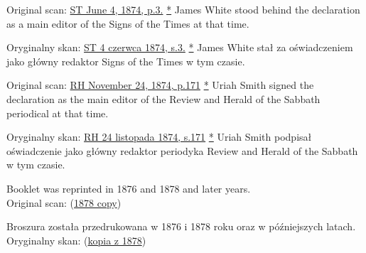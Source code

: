 



Original scan: \href{https://adventistdigitallibrary.org/adl-364148/signs-times-june-4-1874}{ST June 4, 1874, p.3.} \href{https://forgotten-pillar.s3.us-east-2.amazonaws.com/Signs+of+the+Times+_+June+4%2C+1874++.pdf}{*} James White stood behind the declaration as a main editor of the Signs of the Times at that time.


Oryginalny skan: \href{https://adventistdigitallibrary.org/adl-364148/signs-times-june-4-1874}{ST 4 czerwca 1874, s.3.} \href{https://forgotten-pillar.s3.us-east-2.amazonaws.com/Signs+of+the+Times+_+June+4%2C+1874++.pdf}{*} James White stał za oświadczeniem jako główny redaktor Signs of the Times w tym czasie.






Original scan: \href{https://documents.adventistarchives.org/Periodicals/RH/RH18741124-V44-22.pdf}{RH November 24, 1874, p.171} \href{https://forgotten-pillar.s3.us-east-2.amazonaws.com/RH18741124-V44-22.pdf}{*} Uriah Smith signed the declaration as the main editor of the Review and Herald of the Sabbath periodical at that time.


Oryginalny skan: \href{https://documents.adventistarchives.org/Periodicals/RH/RH18741124-V44-22.pdf}{RH 24 listopada 1874, s.171} \href{https://forgotten-pillar.s3.us-east-2.amazonaws.com/RH18741124-V44-22.pdf}{*} Uriah Smith podpisał oświadczenie jako główny redaktor periodyka Review and Herald of the Sabbath w tym czasie.






Booklet was reprinted in 1876 and 1878 and later years. \\
Original scan: (\href{https://adventistdigitallibrary.org/islandora/object/adl%3A22250872?solr_nav%5Bid%5D=a09d3902c2540c98eb7f&solr_nav%5Bpage%5D=56&solr_nav%5Boffset%5D=3}{1878 copy})


Broszura została przedrukowana w 1876 i 1878 roku oraz w późniejszych latach. \\
Oryginalny skan: (\href{https://adventistdigitallibrary.org/islandora/object/adl%3A22250872?solr_nav%5Bid%5D=a09d3902c2540c98eb7f&solr_nav%5Bpage%5D=56&solr_nav%5Boffset%5D=3}{kopia z 1878})


